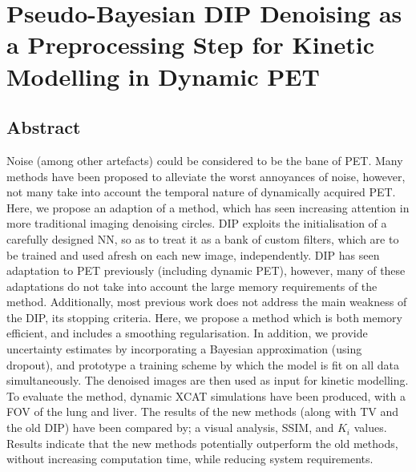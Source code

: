 \chapter{Pseudo-Bayesian DIP Denoising as a Preprocessing Step for Kinetic Modelling in Dynamic PET} \label{sec:pseudo_bayesian_dip_denoising_as_a_preprocessing_step_for_kinetic_modelling_in_dynamic_pet}
    \newpage

    \section{Abstract} \label{sec:pseudo_bayesian_dip_denoising_as_a_preprocessing_step_for_kinetic_modelling_in_dynamic_pet_appendix_abstract}
        Noise (among other artefacts) could be considered to be the bane of \gls{PET}. %
        Many methods have been proposed to alleviate the worst annoyances of noise, however, not many take into account the temporal nature of dynamically acquired \gls{PET}. Here, we propose an adaption of a method, which has seen increasing attention in more traditional imaging denoising circles. \gls{DIP} exploits the initialisation of a carefully designed \gls{NN}, so as to treat it as a bank of custom filters, which are to be trained and used afresh on each new image, independently. \gls{DIP} has seen adaptation to \gls{PET} previously (including dynamic \gls{PET}), however, many of these adaptations do not take into account the large memory requirements of the method. Additionally, most previous work does not address the main weakness of the \gls{DIP}, its stopping criteria. Here, we propose a method which is both memory efficient, and includes a smoothing regularisation. In addition, we provide uncertainty estimates by incorporating a Bayesian approximation (using dropout), and prototype a training scheme by which the model is fit on all data simultaneously. The denoised images are then used as input for kinetic modelling. To evaluate the method, dynamic \gls{XCAT} simulations have been produced, with a \gls{FOV} of the lung and liver. The results of the new methods (along with \gls{TV} and the old \gls{DIP}) have been compared by; a visual analysis, \gls{SSIM}, and $K_i$ values. Results indicate that the new methods potentially outperform the old methods, without increasing computation time, while reducing system requirements.


